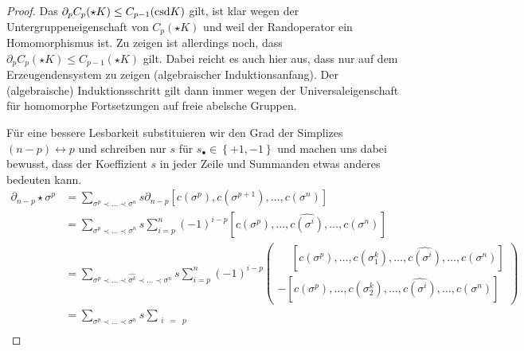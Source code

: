   \begin{proof}
    Das \( \partial_{p} C_{p}(\star K) \le C_{p-1}(\text{csd} K) \) gilt, ist klar wegen der Untergruppeneigenschaft von \( C_{p}(\star K) \) und weil der Randoperator ein Homomorphismus ist.
    Zu zeigen ist allerdings noch, dass \( \partial_{p} C_{p}(\star K) \le C_{p-1}(\star K) \) gilt. 
    Dabei reicht es auch hier aus, dass nur auf dem Erzeugendensystem zu zeigen (algebraischer Induktionsanfang).
    Der (algebraische) Induktionsschritt gilt dann immer wegen der Universaleigenschaft für homomorphe Fortsetzungen auf freie abelsche Gruppen.

    Für eine bessere Lesbarkeit substituieren wir den Grad der Simplizes \( (n-p) \leftrightarrow p \) und schreiben nur \( s \) für \( s_{\bullet} \in \left\{ +1,-1 \right\} \)
    und machen uns dabei bewusst, dass der Koeffizient \( s \) in jeder Zeile und Summanden etwas anderes bedeuten kann.
    \begin{align}
      \partial_{n-p}\star\sigma^{p} &= \sum_{\sigma^{p}\prec\ldots\prec\sigma^{n}} s \partial_{n-p} \left[ c(\sigma^{p}), c(\sigma^{p+1}),\ldots, c(\sigma^{n})\right] \label{eqproof1}\\
                              &= \sum_{\sigma^{p}\prec\ldots\prec\sigma^{n}} s 
                                          \sum_{i=p}^{n} (-1)^{i-p} \left[ c(\sigma^{p}),\ldots, \widehat{c(\sigma^{i})},\ldots, c(\sigma^{n})\right] \label{eqproof2}\\
                              &= \sum_{\sigma^{p}\prec\ldots\prec\widehat{\sigma^{k}}\prec\ldots\prec\sigma^{n}} s
                                          \sum_{i=p}^{n} (-1)^{i-p} 
                              \left(\begin{aligned}
                                            \phantom{-}\left[ c(\sigma^{p}),\ldots, c(\sigma_{1}^{k}),\ldots,\widehat{c(\sigma^{i})},\ldots, c(\sigma^{n})\right] \\
                                                     - \left[ c(\sigma^{p}),\ldots, c(\sigma_{2}^{k}),\ldots,\widehat{c(\sigma^{i})},\ldots, c(\sigma^{n})\right]
                              \end{aligned}\right) \label{eqproof3}\\
                              &= \sum_{\sigma^{p}\prec\ldots\prec\sigma^{n}} s 
                                          \sum_{\begin{smallmatrix}
                                                  i & = & p \\

\end{smallmatrix}}
\end{align}
\end{proof}

